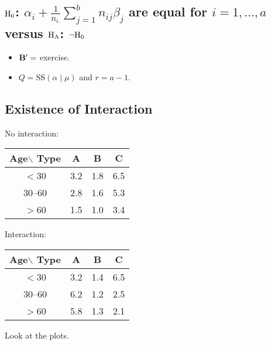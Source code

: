\subsection*{$ \text{H}_0 $: $ \alpha_i+\frac{1}{n_{i.}}\sum_{j=1}^{b}n_{ij}\beta_j $
are equal for $ i=1,\ldots,a $ versus $ \text{H}_{\text{A}} $: $ \lnot\text{H}_0 $}
\begin{itemize}
    \item $ \mathbf{B}'= $ exercise.
    \item $ Q=\text{SS}(\alpha\mid \mu) $ and $ r=a-1 $.
\end{itemize}
\subsection*{Existence of Interaction}
\begin{Example}{}{}
    No interaction:
    \begin{center}
        \begin{tabular}{c|ccc}
            Age$\backslash$ Type & A   & B   & C   \\
            \hline
            $<$30                & 3.2 & 1.8 & 6.5 \\
            30--60               & 2.8 & 1.6 & 5.3 \\
            $>$60                & 1.5 & 1.0 & 3.4
        \end{tabular}
    \end{center}
    Interaction:
    \begin{center}
        \begin{tabular}{c|ccc}
            Age$\backslash$ Type & A   & B   & C   \\
            \hline
            $<$30                & 3.2 & 1.4 & 6.5 \\
            30--60               & 6.2 & 1.2 & 2.5 \\
            $>$60                & 5.8 & 1.3 & 2.1
        \end{tabular}
    \end{center}
    Look at the plots.
\end{Example}
